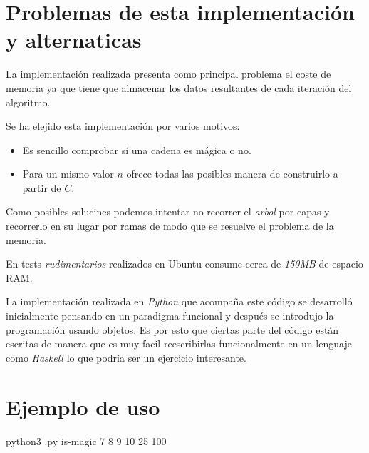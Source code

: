 \documentclass{article}
\begin{document}
\section{Problemas de esta implementación y alternaticas}

La implementación realizada presenta como principal problema el coste
de memoria ya que tiene que almacenar los datos resultantes de cada
iteración del algoritmo.

Se ha elejido esta implementación por varios motivos:

\begin{itemize}
\item Es sencillo comprobar si una cadena es mágica o no.
\item Para un mismo valor $n$ ofrece todas las posibles manera de
  construirlo a partir de $C$.
\end{itemize}

Como posibles solucines podemos intentar no recorrer el \textit{arbol}
por capas y recorrerlo en su lugar por ramas de modo que se resuelve
el problema de la memoria.

En tests \textit{rudimentarios} realizados en Ubuntu consume cerca de
\textit{150MB} de espacio RAM.

La implementación realizada en \textit{Python} que acompaña este
código se desarrolló inicialmente pensando en un paradigma funcional y
después se introdujo la programación usando objetos. Es por esto que
ciertas parte del código están escritas de manera que es muy facil
reescribirlas funcionalmente en un lenguaje como \textit{Haskell} lo
que podría ser un ejercicio interesante.

\section{Ejemplo de uso}

python3 .py is-magic 7 8 9 10 25 100
\end{document}
